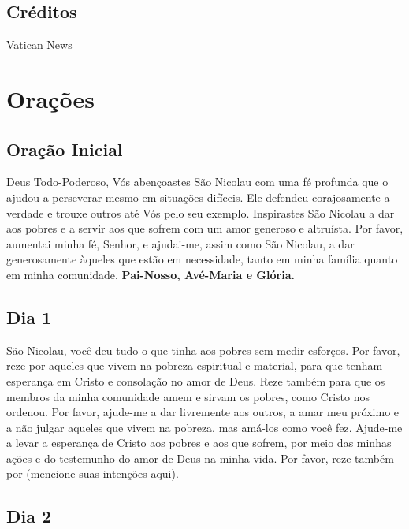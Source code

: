 \documentclass[11pt]{article}
\begin{document}
\subsection*{Créditos }
\href{https://www.vaticannews.va/pt/santo-do-dia/12/06/s--nicolau-de-bari--bispo-de-mira.html}{Vatican News}

\newpage
\section{Orações}\label{oracoes}

\subsection{Oração Inicial} \label{oracao_inicial}

Deus Todo-Poderoso, Vós abençoastes São Nicolau com uma fé profunda que o ajudou a perseverar mesmo em situações difíceis. Ele defendeu corajosamente a verdade e trouxe outros até Vós pelo seu exemplo. Inspirastes São Nicolau a dar aos pobres e a servir aos que sofrem com um amor generoso e altruísta.  
Por favor, aumentai minha fé, Senhor, e ajudai-me, assim como São Nicolau, a dar generosamente àqueles que estão em necessidade, tanto em minha família quanto em minha comunidade.  
\textbf{Pai-Nosso, Avé-Maria e Glória.}

\subsection{Dia 1}

\textbf{}

São Nicolau, você deu tudo o que tinha aos pobres sem medir esforços. Por favor, reze por aqueles que vivem na pobreza espiritual e material, para que tenham esperança em Cristo e consolação no amor de Deus. Reze também para que os membros da minha comunidade amem e sirvam os pobres, como Cristo nos ordenou.  
Por favor, ajude-me a dar livremente aos outros, a amar meu próximo e a não julgar aqueles que vivem na pobreza, mas amá-los como você fez. Ajude-me a levar a esperança de Cristo aos pobres e aos que sofrem, por meio das minhas ações e do testemunho do amor de Deus na minha vida.  
Por favor, reze também por (mencione suas intenções aqui).  

\subsection{Dia 2}
\end{document}
